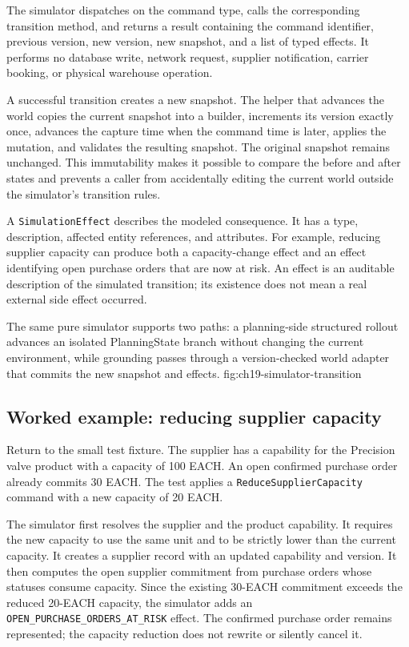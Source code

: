 The simulator dispatches on the command type, calls the corresponding transition method, and returns a result containing the command identifier, previous version, new version, new snapshot, and a list of typed effects. It performs no database write, network request, supplier notification, carrier booking, or physical warehouse operation.

A successful transition creates a new snapshot. The helper that advances the world copies the current snapshot into a builder, increments its version exactly once, advances the capture time when the command time is later, applies the mutation, and validates the resulting snapshot. The original snapshot remains unchanged. This immutability makes it possible to compare the before and after states and prevents a caller from accidentally editing the current world outside the simulator's transition rules.

A \texttt{SimulationEffect} describes the modeled consequence. It has a type, description, affected entity references, and attributes. For example, reducing supplier capacity can produce both a capacity-change effect and an effect identifying open purchase orders that are now at risk. An effect is an auditable description of the simulated transition; its existence does not mean a real external side effect occurred.

  {The same pure simulator supports two paths: a planning-side structured rollout advances an isolated PlanningState branch without changing the current environment, while grounding passes through a version-checked world adapter that commits the new snapshot and effects.}
  {fig:ch19-simulator-transition}

\subsection{Worked example: reducing supplier capacity}

Return to the small test fixture. The supplier has a capability for the Precision valve product with a capacity of 100 EACH. An open confirmed purchase order already commits 30 EACH. The test applies a \texttt{ReduceSupplierCapacity} command with a new capacity of 20 EACH.

The simulator first resolves the supplier and the product capability. It requires the new capacity to use the same unit and to be strictly lower than the current capacity. It creates a supplier record with an updated capability and version. It then computes the open supplier commitment from purchase orders whose statuses consume capacity. Since the existing 30-EACH commitment exceeds the reduced 20-EACH capacity, the simulator adds an \texttt{OPEN\_PURCHASE\_ORDERS\_AT\_RISK} effect. The confirmed purchase order remains represented; the capacity reduction does not rewrite or silently cancel it.

